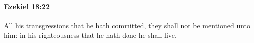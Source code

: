 
		\paragraph{Ezekiel 18:22} %
			\label{EZEKIEL-18-22}

			All his transgressions that he hath committed, they shall not be mentioned unto him: in his righteousness that he hath done he shall live.



